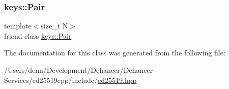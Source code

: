 \subsubsection{\texorpdfstring{keys\+::\+Pair}{keys::Pair}}
{\footnotesize\ttfamily template$<$size\+\_\+t N$>$ \\
friend class \mbox{\hyperlink{classed25519_1_1keys_1_1_pair}{keys\+::\+Pair}}\hspace{0.3cm}{\ttfamily [friend]}}



The documentation for this class was generated from the following file\+:\begin{DoxyCompactItemize}
\item 
/\+Users/denn/\+Development/\+Dehancer/\+Dehancer-\/\+Services/ed25519cpp/include/\mbox{\hyperlink{ed25519_8hpp}{ed25519.\+hpp}}\end{DoxyCompactItemize}
